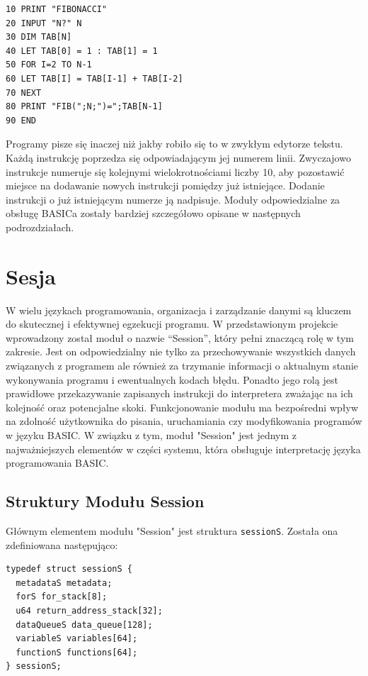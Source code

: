 \documentclass[shortabstract]{iithesis}
\begin{document}
\begin{verbatim}
10 PRINT "FIBONACCI"
20 INPUT "N?" N
30 DIM TAB[N]
40 LET TAB[0] = 1 : TAB[1] = 1
50 FOR I=2 TO N-1
60 LET TAB[I] = TAB[I-1] + TAB[I-2]
70 NEXT
80 PRINT "FIB(";N;")=";TAB[N-1]
90 END
\end{verbatim}

Programy pisze się inaczej niż jakby robiło się to w zwykłym edytorze tekstu. Każdą instrukcję poprzedza się odpowiadającym jej numerem linii. Zwyczajowo instrukcje numeruje się kolejnymi wielokrotnościami liczby 10, aby pozostawić miejsce na dodawanie nowych instrukcji pomiędzy już istniejące. Dodanie instrukcji o już istniejącym numerze ją nadpisuje. Moduły odpowiedzialne za obsługę BASICa zostały bardziej szczegółowo opisane w następnych podrozdziałach.

\section{Sesja}
W wielu językach programowania, organizacja i zarządzanie danymi są kluczem do skutecznej i efektywnej egzekucji programu. W przedstawionym projekcie wprowadzony został moduł o nazwie “Session”, który pełni znaczącą rolę w tym zakresie. Jest on odpowiedzialny nie tylko za przechowywanie wszystkich danych związanych z programem ale również za trzymanie informacji o aktualnym stanie wykonywania programu i ewentualnych kodach błędu. Ponadto jego rolą jest prawidłowe przekazywanie zapisanych instrukcji do interpretera zważając na ich kolejność oraz potencjalne skoki. Funkcjonowanie modułu ma bezpośredni wpływ na zdolność użytkownika do pisania, uruchamiania czy modyfikowania programów w języku BASIC. W związku z tym, moduł "Session" jest jednym z najważniejszych elementów w części systemu, która obsługuje interpretację języka programowania BASIC.
\subsection{Struktury Modułu Session}
Głównym elementem modułu "Session" jest struktura \texttt{sessionS}. Została ona zdefiniowana następująco:
\begin{verbatim}
typedef struct sessionS {
  metadataS metadata;
  forS for_stack[8];
  u64 return_address_stack[32];
  dataQueueS data_queue[128];
  variableS variables[64];
  functionS functions[64];
} sessionS;
\end{verbatim}
\end{document}
